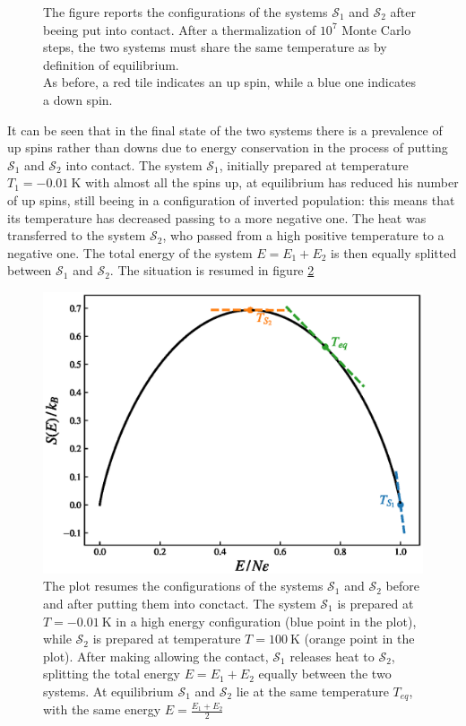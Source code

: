 \begin{figure}[hbtp]
\begin{minipage}[c]{0.45\textwidth}
    \end{minipage}
    \hfill
    \caption{The figure reports the configurations of the systems $\mathcal{S}_1$ and $\mathcal{S}_2$ after beeing put into contact. After a thermalization of $10^7$ Monte Carlo steps, the two systems must share the same temperature as by definition of equilibrium. \\
    As before, a red tile indicates an up spin, while a blue one indicates a down spin.}
    \label{fig:contact_final}
\end{figure}
It can be seen that in the final state of the two systems there is a prevalence of up spins rather than downs due to energy conservation in the process of putting $\mathcal{S}_1$ and $\mathcal{S}_2$ into contact. The system $\mathcal{S}_1$, initially prepared at temperature $T_1 = \SI{-0.01}{\kelvin}$ with almost all the spins up, at equilibrium has reduced his number of up spins, still
beeing in a configuration of inverted population: this means that its temperature has decreased passing to a more negative one. The heat was transferred to the system $\mathcal{S}_2$, who passed from a high positive temperature to a negative one. The total energy of the system $E = E_1 + E_2$ is then equally splitted between $\mathcal{S}_1$ and $\mathcal{S}_2$. The situation is resumed in figure \ref{fig:contact_E_S_1}
\begin{figure}
    \centering 
    \includegraphics[scale=0.7]{./images/ising/mixing_SE_plot.eps}
    \caption{The plot resumes the configurations of the systems $\mathcal{S}_1$ and $\mathcal{S}_2$ before and after putting them into conctact. The system $\mathcal{S}_1$ is prepared at $T = \SI{-0.01}{\kelvin}$ in a high energy configuration (blue point in the plot), while $\mathcal{S}_2$ is prepared at temperature $T = \SI{100}{\kelvin}$ (orange point in the plot). After making allowing the contact, 
    $\mathcal{S}_1$ releases heat to $\mathcal{S}_2$, splitting the total energy $E = E_1 + E_2$ equally between the two systems. At equilibrium $\mathcal{S}_1$ and $\mathcal{S}_2$ lie at the same temperature $T_{eq}$, with the same energy $E = \frac{E_1 + E_2}{2}$}
    \label{fig:contact_E_S_1}
\end{figure}